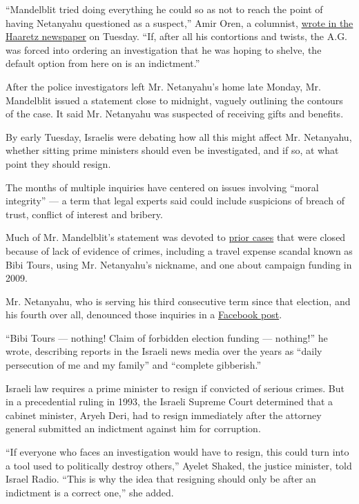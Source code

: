 ``Mandelblit tried doing everything he could so as not to reach the
point of having Netanyahu questioned as a suspect,'' Amir Oren, a
columnist, \href{http://www.haaretz.com/opinion/.premium-1.762624}{wrote
in the Haaretz newspaper} on Tuesday. ``If, after all his contortions
and twists, the A.G. was forced into ordering an investigation that he
was hoping to shelve, the default option from here on is an
indictment.''

After the police investigators left Mr. Netanyahu's home late Monday,
Mr. Mandelblit issued a statement close to midnight, vaguely outlining
the contours of the case. It said Mr. Netanyahu was suspected of
receiving gifts and benefits.

By early Tuesday, Israelis were debating how all this might affect Mr.
Netanyahu, whether sitting prime ministers should even be investigated,
and if so, at what point they should resign.

The months of multiple inquiries have centered on issues involving
``moral integrity'' --- a term that legal experts said could include
suspicions of breach of trust, conflict of interest and bribery.

Much of Mr. Mandelblit's statement was devoted to
\href{https://www.nytimes.com/2016/08/01/world/middleeast/israel-netanyahu-scandal-corruption.html?_r=0}{prior
cases} that were closed because of lack of evidence of crimes, including
a travel expense scandal known as Bibi Tours, using Mr. Netanyahu's
nickname, and one about campaign funding in 2009.

Mr. Netanyahu, who is serving his third consecutive term since that
election, and his fourth over all, denounced those inquiries in a
\href{https://www.facebook.com/Netanyahu/}{Facebook post}.

``Bibi Tours --- nothing! Claim of forbidden election funding ---
nothing!'' he wrote, describing reports in the Israeli news media over
the years as ``daily persecution of me and my family'' and ``complete
gibberish.''

Israeli law requires a prime minister to resign if convicted of serious
crimes. But in a precedential ruling in 1993, the Israeli Supreme Court
determined that a cabinet minister, Aryeh Deri, had to resign
immediately after the attorney general submitted an indictment against
him for corruption.

``If everyone who faces an investigation would have to resign, this
could turn into a tool used to politically destroy others,'' Ayelet
Shaked, the justice minister, told Israel Radio. ``This is why the idea
that resigning should only be after an indictment is a correct one,''
she added.

